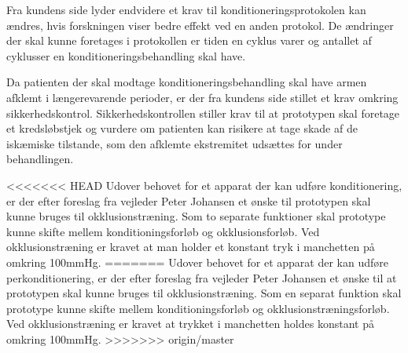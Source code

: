 Fra kundens side lyder endvidere et krav til konditioneringsprotokolen kan ændres, hvis forskningen viser bedre effekt ved en anden protokol. De ændringer der skal kunne foretages i protokollen er tiden en cyklus varer og antallet af cyklusser en konditioneringsbehandling skal have. 

Da patienten der skal modtage konditioneringsbehandling skal have armen afklemt i længerevarende perioder, er der fra kundens side stillet et krav omkring sikkerhedskontrol. Sikkerhedskontrollen stiller krav til at prototypen skal foretage et kredsløbstjek og vurdere om patienten kan risikere at tage skade af de iskæmiske tilstande, som den afklemte ekstremitet udsættes for under behandlingen.

<<<<<<< HEAD
Udover behovet for et apparat der kan udføre konditionering, er der efter foreslag fra vejleder Peter Johansen et ønske til prototypen skal kunne bruges til okklusionstræning. Som to separate funktioner skal prototype kunne skifte mellem konditioningsforløb og okklusionsforløb. Ved okklusionstræning er kravet at man holder et konstant tryk i manchetten på omkring 100mmHg. 
=======
Udover behovet for et apparat der kan udføre perkonditionering, er der efter foreslag fra vejleder Peter Johansen et ønske til at prototypen skal kunne bruges til okklusionstræning. Som en separat funktion skal prototype kunne skifte mellem konditioningsforløb og okklusionstræningsforløb. Ved okklusionstræning er kravet at trykket i manchetten holdes konstant på omkring 100mmHg. 
>>>>>>> origin/master

